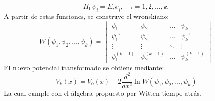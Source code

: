 \documentclass[%
 aip,
 jmp,%
 amsmath,amssymb,
 reprint,
]{revtex4-2}
\begin{document}
\begin{equation}
H_0 \psi_i = E_i \psi_i, \quad i = 1, 2, \dots, k.
\end{equation}
A partir de estas funciones, se construye el wronskiano:
\begin{equation}
W(\psi_1, \psi_2, \dots, \psi_k) =
\begin{vmatrix}
\psi_1 & \psi_2 & \dots & \psi_k \\
\psi_1' & \psi_2' & \dots & \psi_k' \\
\vdots & \vdots & \ddots & \vdots \\
\psi_1^{(k-1)} & \psi_2^{(k-1)} & \dots & \psi_k^{(k-1)}
\end{vmatrix}
\end{equation}
El nuevo potencial transformado se obtiene mediante:
\begin{equation}
V_k(x) = V_0(x) - 2 \frac{d^2}{dx^2} \ln W(\psi_1, \psi_2, \dots, \psi_k)
\end{equation}
La cual cumple con el álgebra propuesto por Witten tiempo atrás.
\end{document}
